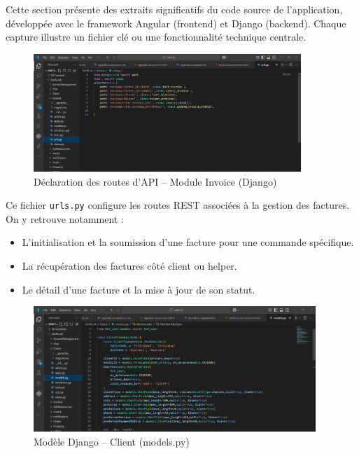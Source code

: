 Cette section présente des extraits significatifs du code source de l'application, développée avec le framework Angular (frontend) et Django (backend). Chaque capture illustre un fichier clé ou une fonctionnalité technique centrale.

\begin{figure}[H]
    \centering
    \includegraphics[width=0.9\textwidth]{figures/urls.png}
    \caption{Déclaration des routes d'API – Module Invoice (Django)}
\end{figure}

\noindent
Ce fichier \texttt{urls.py} configure les routes REST associées à la gestion des factures. On y retrouve notamment :
\begin{itemize}
    \item L'initialisation et la soumission d'une facture pour une commande spécifique.
    \item La récupération des factures côté client ou helper.
    \item Le détail d'une facture et la mise à jour de son statut.
\end{itemize}

\vspace{0.5cm}

\begin{figure}[H]
    \centering
    \includegraphics[width=0.95\textwidth]{figures/modele client.png}
    \caption{Modèle Django – Client (models.py)}
\end{figure}

